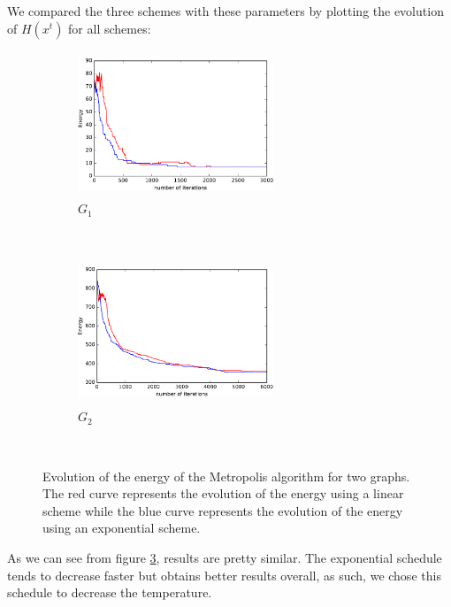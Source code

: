 \documentclass[a4paper]{article}
\begin{document}
We compared the three schemes with these parameters by plotting the evolution of $H(x^t)$ for all schemes:
\begin{figure}[H]
    \centering
    \begin{subfigure}[b]{0.45\textwidth}
        \includegraphics[width=2.3in, height = 1.7in]{H_G1_cropped.pdf}
        \caption{$G_1$}
        \label{fig:g1}
    \end{subfigure}
    ~ %
    \begin{subfigure}[b]{0.45\textwidth}
        \includegraphics[width=2.3in, height=1.7in]{H_G2_cropped.pdf}
        \caption{$G_2$}
        \label{fig:g2}
    \end{subfigure}
    ~ %
    \caption{Evolution of the energy of the Metropolis algorithm for two graphs. The red curve represents the evolution of the energy using a linear scheme while the blue curve represents the evolution of the energy using an exponential scheme.}
    \label{fig:comparison}
\end{figure}

As we can see from figure \ref{fig:comparison}, results are pretty similar. The exponential schedule tends to decrease faster but obtains better results overall, as such, we chose this schedule to decrease the temperature.
\end{document}
